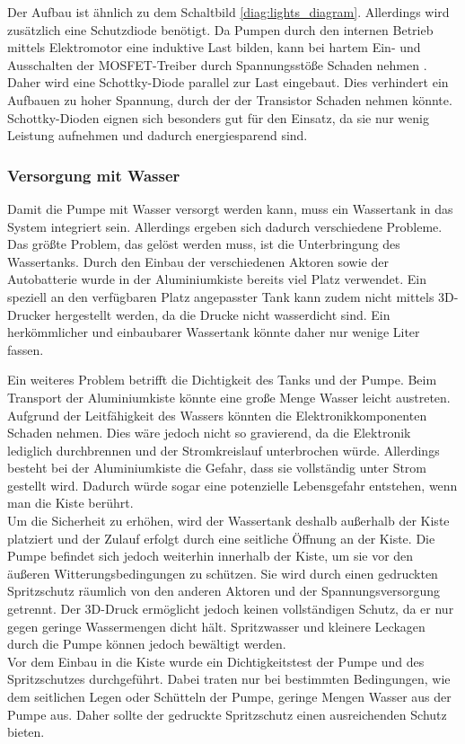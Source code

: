 Der Aufbau ist ähnlich zu dem Schaltbild \ref{diag:lights_diagram}. Allerdings wird zusätzlich eine Schutzdiode benötigt. Da Pumpen durch den internen Betrieb mittels Elektromotor eine induktive Last bilden, kann bei hartem Ein- und Ausschalten der MOSFET-Treiber durch Spannungsstöße Schaden nehmen \cite{induktive_last_diode}. Daher wird eine Schottky-Diode parallel zur Last eingebaut. Dies verhindert ein Aufbauen zu hoher Spannung, durch der der Transistor Schaden nehmen könnte. Schottky-Dioden eignen sich besonders gut für den Einsatz, da sie nur wenig Leistung aufnehmen und dadurch energiesparend sind. \cite{induktive_last_diode,am_schottky}

\subsubsection{Versorgung mit Wasser}

Damit die Pumpe mit Wasser versorgt werden kann, muss ein Wassertank in das System integriert sein. Allerdings ergeben sich dadurch verschiedene Probleme.
\\
Das größte Problem, das gelöst werden muss, ist die Unterbringung des Wassertanks. Durch den Einbau der verschiedenen Aktoren sowie der Autobatterie wurde in der Aluminiumkiste bereits viel Platz verwendet. Ein speziell an den verfügbaren Platz angepasster Tank kann zudem nicht mittels 3D-Drucker hergestellt werden, da die Drucke nicht wasserdicht sind. Ein herkömmlicher und einbaubarer Wassertank könnte daher nur wenige Liter fassen.

Ein weiteres Problem betrifft die Dichtigkeit des Tanks und der Pumpe. Beim Transport der Aluminiumkiste könnte eine große Menge Wasser leicht austreten. Aufgrund der Leitfähigkeit des Wassers könnten die Elektronikkomponenten Schaden nehmen. Dies wäre jedoch nicht so gravierend, da die Elektronik lediglich durchbrennen und der Stromkreislauf unterbrochen würde. Allerdings besteht bei der Aluminiumkiste die Gefahr, dass sie vollständig unter Strom gestellt wird. Dadurch würde sogar eine potenzielle Lebensgefahr entstehen, wenn man die Kiste berührt.
\\
Um die Sicherheit zu erhöhen, wird der Wassertank deshalb außerhalb der Kiste platziert und der Zulauf erfolgt durch eine seitliche Öffnung an der Kiste. Die Pumpe befindet sich jedoch weiterhin innerhalb der Kiste, um sie vor den äußeren Witterungsbedingungen zu schützen. Sie wird durch einen gedruckten Spritzschutz räumlich von den anderen Aktoren und der Spannungsversorgung getrennt. Der 3D-Druck ermöglicht jedoch keinen vollständigen Schutz, da er nur gegen geringe Wassermengen dicht hält. Spritzwasser und kleinere Leckagen durch die Pumpe können jedoch bewältigt werden.
\\
Vor dem Einbau in die Kiste wurde ein Dichtigkeitstest der Pumpe und des Spritzschutzes durchgeführt. Dabei traten nur bei bestimmten Bedingungen, wie dem seitlichen Legen oder Schütteln der Pumpe, geringe Mengen Wasser aus der Pumpe aus. Daher sollte der gedruckte Spritzschutz einen ausreichenden Schutz bieten.

